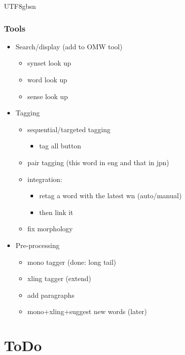 \documentclass[12pt]{book} %
\begin{document}
\begin{CJK}{UTF8}{gbsn}
\subsubsection{Tools}
\begin{itemize}
\item Search/display (add to OMW tool)
  \begin{itemize}
  \item synset look up
  \item word look up
  \item sense look up
  \end{itemize}
\item Tagging
  \begin{itemize}
  \item sequential/targeted tagging
    \begin{itemize}
    \item tag all button
    \end{itemize}
  \item pair tagging (this word in eng and that in jpn)
  \item integration:
    \begin{itemize}
    \item retag a word with the latest wn (auto/manual)
    \item then link it
    \end{itemize}
  \item fix morphology
  \end{itemize}
\item Pre-processing
  \begin{itemize}
  \item mono tagger (done: long tail)
  \item xling tagger (extend)
  \item add paragraphs
  \item mono+xling+suggest new words (later)
  \end{itemize}
\end{itemize}





\section{ToDo}


\end{CJK}
\end{document}
